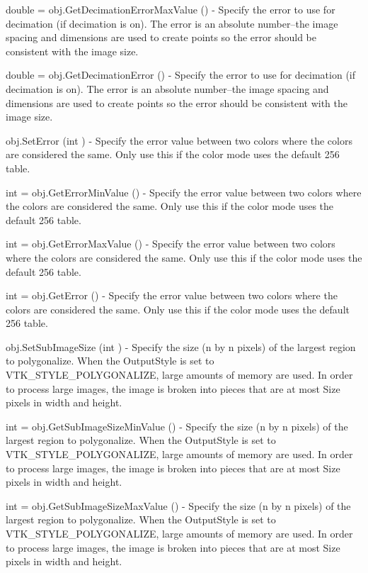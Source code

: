 \begin{DoxyItemize}
\item {\ttfamily double = obj.\-Get\-Decimation\-Error\-Max\-Value ()} -\/ Specify the error to use for decimation (if decimation is on). The error is an absolute number--the image spacing and dimensions are used to create points so the error should be consistent with the image size.  
\item {\ttfamily double = obj.\-Get\-Decimation\-Error ()} -\/ Specify the error to use for decimation (if decimation is on). The error is an absolute number--the image spacing and dimensions are used to create points so the error should be consistent with the image size.  
\item {\ttfamily obj.\-Set\-Error (int )} -\/ Specify the error value between two colors where the colors are considered the same. Only use this if the color mode uses the default 256 table.  
\item {\ttfamily int = obj.\-Get\-Error\-Min\-Value ()} -\/ Specify the error value between two colors where the colors are considered the same. Only use this if the color mode uses the default 256 table.  
\item {\ttfamily int = obj.\-Get\-Error\-Max\-Value ()} -\/ Specify the error value between two colors where the colors are considered the same. Only use this if the color mode uses the default 256 table.  
\item {\ttfamily int = obj.\-Get\-Error ()} -\/ Specify the error value between two colors where the colors are considered the same. Only use this if the color mode uses the default 256 table.  
\item {\ttfamily obj.\-Set\-Sub\-Image\-Size (int )} -\/ Specify the size (n by n pixels) of the largest region to polygonalize. When the Output\-Style is set to V\-T\-K\-\_\-\-S\-T\-Y\-L\-E\-\_\-\-P\-O\-L\-Y\-G\-O\-N\-A\-L\-I\-Z\-E, large amounts of memory are used. In order to process large images, the image is broken into pieces that are at most Size pixels in width and height.  
\item {\ttfamily int = obj.\-Get\-Sub\-Image\-Size\-Min\-Value ()} -\/ Specify the size (n by n pixels) of the largest region to polygonalize. When the Output\-Style is set to V\-T\-K\-\_\-\-S\-T\-Y\-L\-E\-\_\-\-P\-O\-L\-Y\-G\-O\-N\-A\-L\-I\-Z\-E, large amounts of memory are used. In order to process large images, the image is broken into pieces that are at most Size pixels in width and height.  
\item {\ttfamily int = obj.\-Get\-Sub\-Image\-Size\-Max\-Value ()} -\/ Specify the size (n by n pixels) of the largest region to polygonalize. When the Output\-Style is set to V\-T\-K\-\_\-\-S\-T\-Y\-L\-E\-\_\-\-P\-O\-L\-Y\-G\-O\-N\-A\-L\-I\-Z\-E, large amounts of memory are used. In order to process large images, the image is broken into pieces that are at most Size pixels in width and height.  

\end{DoxyItemize}
